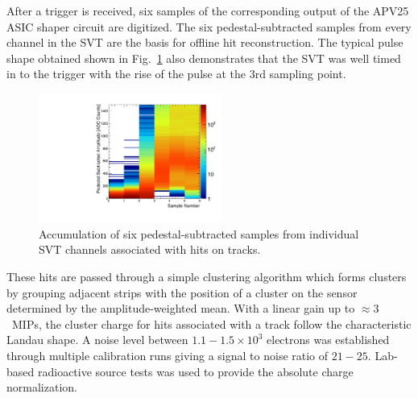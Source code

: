 \documentclass[final,3p,times,twocolumn]{elsarticle}
\begin{document}
After a trigger is received, six samples of the corresponding output of the APV25 ASIC shaper circuit are 
digitized. The six pedestal-subtracted samples from every channel in the SVT are the basis for offline hit 
reconstruction. The typical pulse shape obtained shown in Fig.~\ref{fig:pulse_shape} also 
demonstrates that the SVT was well timed in to the trigger with the rise of the pulse at the 3rd sampling 
point.
\begin{figure}[]
\begin{center}
{\small
	\includegraphics[width=6cm]{figures/run1351_110513_samples_L1_top.pdf}
	\caption{Accumulation of six pedestal-subtracted samples from individual SVT channels associated 
	with hits on tracks.}
	\label{fig:pulse_shape}
}
\end{center}
\end{figure}
These hits are passed through a simple clustering algorithm which forms clusters by grouping adjacent 
strips with the position of a cluster on the sensor determined by the amplitude-weighted mean.
With a linear gain up to $\approx 3$~MIPs, the cluster charge for hits associated with a track follow 
the characteristic Landau shape. 
A noise level between $1.1-1.5\times 10^{3}$ electrons was established through multiple calibration 
runs giving a signal to noise ratio of $21-25$. Lab-based radioactive source tests was used to 
provide the absolute charge normalization.
\end{document}
